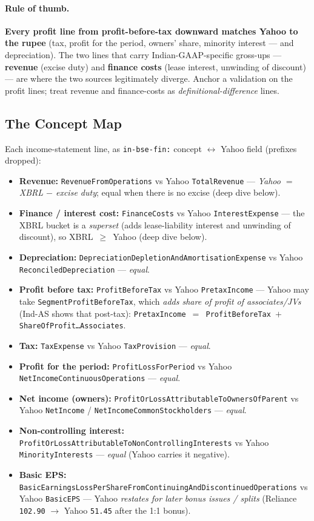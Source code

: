 \documentclass[11pt,a4paper]{report}
\begin{document}
\paragraph{Rule of thumb.} \textbf{Every profit line from profit-before-tax downward matches Yahoo to the
rupee} (tax, profit for the period, owners' share, minority interest --- and depreciation). The two lines
that carry Indian-GAAP-specific gross-ups --- \textbf{revenue} (excise duty) and \textbf{finance costs}
(lease interest, unwinding of discount) --- are where the two sources legitimately diverge. Anchor a
validation on the profit lines; treat revenue and finance-costs as \emph{definitional-difference} lines.

\subsection{The Concept Map}
Each income-statement line, as \texttt{in-bse-fin:} concept $\leftrightarrow$ Yahoo field (prefixes dropped):

\begin{itemize}
  \item \textbf{Revenue:} \texttt{RevenueFromOperations} vs Yahoo \texttt{TotalRevenue} ---
    \emph{Yahoo $=$ XBRL $-$ excise duty}; equal when there is no excise (deep dive below).
  \item \textbf{Finance / interest cost:} \texttt{FinanceCosts} vs Yahoo \texttt{InterestExpense} --- the
    XBRL bucket is a \emph{superset} (adds lease-liability interest and unwinding of discount), so
    XBRL~$\ge$~Yahoo (deep dive below).
  \item \textbf{Depreciation:} \texttt{DepreciationDepletionAndAmortisationExpense} vs Yahoo
    \texttt{ReconciledDepreciation} --- \emph{equal}.
  \item \textbf{Profit before tax:} \texttt{ProfitBeforeTax} vs Yahoo \texttt{PretaxIncome} --- Yahoo may
    take \texttt{SegmentProfitBeforeTax}, which \emph{adds share of profit of associates/JVs} (Ind-AS shows
    that post-tax): \texttt{PretaxIncome $=$ ProfitBeforeTax $+$ ShareOfProfit\ldots Associates}.
  \item \textbf{Tax:} \texttt{TaxExpense} vs Yahoo \texttt{TaxProvision} --- \emph{equal}.
  \item \textbf{Profit for the period:} \texttt{ProfitLossForPeriod} vs Yahoo
    \texttt{NetIncomeContinuousOperations} --- \emph{equal}.
  \item \textbf{Net income (owners):} \texttt{ProfitOrLossAttributableToOwnersOfParent} vs Yahoo
    \texttt{NetIncome} / \texttt{NetIncomeCommonStockholders} --- \emph{equal}.
  \item \textbf{Non-controlling interest:} \texttt{ProfitOrLossAttributableToNonControllingInterests} vs
    Yahoo \texttt{MinorityInterests} --- \emph{equal} (Yahoo carries it negative).
  \item \textbf{Basic EPS:} \texttt{BasicEarningsLossPerShareFromContinuingAndDiscontinuedOperations} vs
    Yahoo \texttt{BasicEPS} --- Yahoo \emph{restates for later bonus issues / splits} (Reliance
    \texttt{102.90} $\to$ Yahoo \texttt{51.45} after the 1:1 bonus).
\end{itemize}
\end{document}
